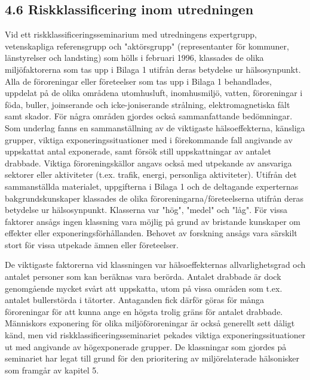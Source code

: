 \subsection*{4.6 Riskklassificering inom utredningen}
Vid ett riskklassificeringsseminarium med utredningens expertgrupp, vetenskapliga referensgrupp och "aktörsgrupp" (representanter för kommuner, länstyrelser och landsting) som hölls i februari 1996, klassades de olika miljöfaktorerna som tas upp i Bilaga 1 utifrån deras betydelse ur hälsosynpunkt.
Alla de föroreningar eller företeelser som tas upp i Bilaga 1 behandlades, uppdelat på de olika områdena utomhusluft, inomhusmiljö, vatten, föroreningar i föda, buller, joinserande och icke-joniserande strålning, elektromagnetiska fålt samt skador. För några områden gjordes också sammanfattande bedömningar. Som underlag fanns en sammanställning av de viktigaste hälsoeffekterna, känsliga grupper, viktiga exponeringssituationer med i förekommande fall angivande av uppskattat antal exponerade, samt försök still uppskattningar av antalet drabbade. Viktiga föroreningskällor angavs också med utpekande av ansvariga sektorer eller aktiviteter (t.ex. trafik, energi, personliga aktiviteter).
Utifrån det sammanställda materialet, uppgifterna i Bilaga 1 och de deltagande experternas bakgrundskunskaper klassades de olika föroreningarna/företeelserna utifrån deras betydelse ur hälsosynpunkt. Klasserna var "hög", "medel" och "låg". För vissa faktorer ansågs ingen klassning vara möjlig på grund av bristande kunskaper om effekter eller exponeringsförhållanden. Behovet av forskning ansågs vara särskilt stort för vissa utpekade ämnen eller företeelser.

De viktigaste faktorerna vid klassningen var hälsoeffekternas allvarlighetsgrad och antalet personer som kan beräknas vara berörda. Antalet drabbade är dock genomgående mycket svårt att uppskatta, utom på vissa områden som t.ex. antalet bullerstörda i tätorter. Antaganden fick därför göras för många föroreningar för att kunna ange en högsta trolig gräns för antalet drabbade.
Människors exponering för olika miljöföroreningar är också generellt sett dåligt känd, men vid riskklassificeringsseminariet pekades viktiga exponeringssituationer ut med angivande av högexponerade grupper. De klassningar som gjordes på seminariet har legat till grund för den prioritering av miljörelaterade hälsonisker som framgår av kapitel 5.
